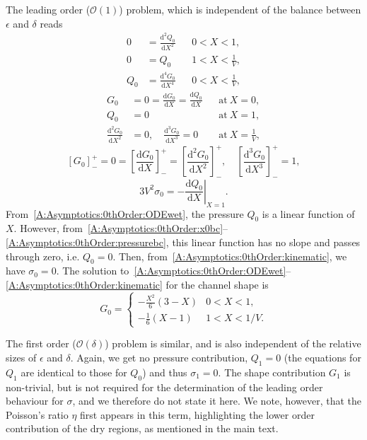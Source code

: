 \documentclass{jfm}
\newcommand{\dd}[2]{\frac{\mathrm{d} #1}{\mathrm{d} #2}}
\newcommand{\order}[1]{\mathcal{O}\left(#1\right)}
\newcommand{\poisson}{\eta} %
\begin{document}
The leading order ($\order{1}$) problem, which is independent of the balance between $\epsilon$ and $\delta$ reads
\begin{align}
0&= \dd{^2Q_0}{X^2} & &0 < X<1,\label{A:Asymptotics:0thOrder:ODEwet}\\
0&= Q_0  & &1 < X< \frac{1}{V},\\
Q_0 &= \dd{^4 G_0}{X^4} & & 0 < X < \frac{1}{V},
\end{align}
\begin{align}
G_0 &= 0 = \dd{G_0}{X}= \dd{Q_0}{X} & &\text{at}~X = 0,\label{A:Asymptotics:0thOrder:x0bc}\\
Q_0 &=0 & &\text{at}~X = 1,\label{A:Asymptotics:0thOrder:pressurebc}\\
\dd{^2 G_0}{X^2}&=0, \quad  \dd{^3 G_0}{X^3} = 0 & &\text{at}~X = \frac{1}{V},
\end{align}
\begin{equation}
\left[G_0\right]_-^+ =0 = \left[\dd{G_0}{X}\right]_-^+ = \left[\dd{^2 G_0}{X^2}\right]_-^+, \quad  \left[\dd{^3 G_0}{X^3}\right]_-^+ = 1,
\end{equation}
\begin{equation}\label{A:Asymptotics:0thOrder:kinematic}
3V^2 \sigma_0 = -\left.\dd{Q_0}{X}\right|_{X=1}.
\end{equation}
From~\eqref{A:Asymptotics:0thOrder:ODEwet},  the pressure $Q_0$ is a linear function of $X$. However, from~\eqref{A:Asymptotics:0thOrder:x0bc}--\eqref{A:Asymptotics:0thOrder:pressurebc}, this linear function has no slope and passes through zero, i.e. $Q_0 = 0$. Then, from~\eqref{A:Asymptotics:0thOrder:kinematic}, we have $\sigma_0 = 0$. The solution to~\eqref{A:Asymptotics:0thOrder:ODEwet}--\eqref{A:Asymptotics:0thOrder:kinematic} for the channel shape is
\begin{equation}\label{A:Asymptotics:0thOrder:solution}
G_0 = \begin{cases}
-\frac{X^2}{6}\left(3-X\right) & 0 < X < 1,\\
-\frac{1}{6}\left(X-1\right) & 1< X < 1/V.
\end{cases}
\end{equation}

The first order ($\order{\delta}$) problem is similar, and is also independent of the relative sizes of $\epsilon$ and $\delta$. Again, we get no pressure contribution, $Q_1 = 0$ (the equations for $Q_1$ are identical to those for $Q_0$) and thus $\sigma_1 = 0$. The shape contribution $G_1$ is non-trivial, but is not required for the determination of the leading order behaviour for $\sigma$, and we therefore do not state it here. We note, however, that the Poisson's ratio $\poisson$ first appears in this term, highlighting the lower order contribution of the dry regions, as mentioned in the main text.
\end{document}
